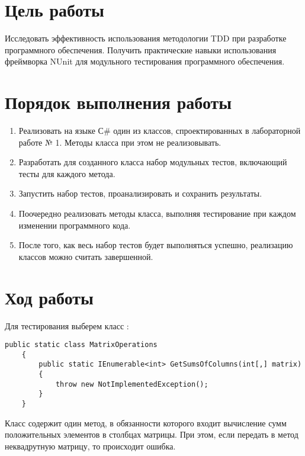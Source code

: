 \documentclass[a4paper,14pt]{extarticle}
\begin{document}

\section{Цель работы}
Исследовать эффективность использования методологии TDD при разработке
программного обеспечения. Получить практические навыки использования
фреймворка NUnit для модульного тестирования программного обеспечения.

\section{Порядок выполнения работы}
\begin{enumerate}
    \item Реализовать на языке С\# один из классов, спроектированных в лабораторной
    работе № 1. Методы класса при этом не реализовывать.
    \item Разработать для созданного класса набор модульных тестов,
    включающий тесты для каждого метода.
    \item Запустить набор тестов, проанализировать и сохранить результаты.
    \item Поочередно реализовать методы класса, выполняя тестирование при
    каждом изменении программного кода.
    \item После того, как весь набор тестов будет выполняться успешно,
    реализацию классов можно считать завершенной.
\end{enumerate}

\section{Ход работы}
Для тестирования выберем класс :
\begin{lstlisting}
public static class MatrixOperations
    {
        public static IEnumerable<int> GetSumsOfColumns(int[,] matrix)
        {
            throw new NotImplementedException();
        }
    }
\end{lstlisting}

Класс содержит один метод, в обязанности которого входит вычисление сумм 
положительных элементов в столбцах матрицы. При этом, если передать в метод
неквадрутную матрицу, то происходит ошибка.
\end{document}
